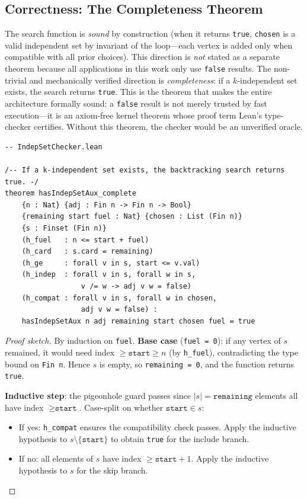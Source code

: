 \documentclass[11pt]{article}
\newcommand{\lean}[1]{\texttt{#1}}
\begin{document}
\subsection{Correctness: The Completeness Theorem}
\label{sec:checker:correct}

The search function is \emph{sound} by construction (when it returns
\lean{true}, \lean{chosen} is a valid independent set by invariant of the
loop---each vertex is added only when compatible with all prior choices).
This direction is \emph{not} stated as a separate theorem because all
applications in this work only use \lean{false} results.
The non-trivial and mechanically verified direction is \emph{completeness}:
if a $k$-independent set exists, the search returns \lean{true}.
This is the theorem that makes the entire architecture formally sound:
a \lean{false} result is not merely trusted by fast execution---it is an
axiom-free kernel theorem whose proof term Lean's type-checker certifies.
Without this theorem, the checker would be an unverified oracle.

\begin{lstlisting}
-- IndepSetChecker.lean

/-- If a k-independent set exists, the backtracking search returns true. -/
theorem hasIndepSetAux_complete
    {n : Nat} {adj : Fin n -> Fin n -> Bool}
    {remaining start fuel : Nat} {chosen : List (Fin n)}
    {s : Finset (Fin n)}
    (h_fuel   : n <= start + fuel)
    (h_card   : s.card = remaining)
    (h_ge     : forall v in s, start <= v.val)
    (h_indep  : forall v in s, forall w in s,
                  v /= w -> adj v w = false)
    (h_compat : forall v in s, forall w in chosen,
                  adj v w = false) :
    hasIndepSetAux n adj remaining start chosen fuel = true
\end{lstlisting}

\begin{proof}[Proof sketch]
By induction on \lean{fuel}.
\textbf{Base case} (\lean{fuel = 0}): if any vertex of $s$ remained,
it would need index $\geq \lean{start} \geq n$ (by \lean{h\_fuel}),
contradicting the type bound on \lean{Fin n}.
Hence $s$ is empty, so \lean{remaining = 0}, and the function returns
\lean{true}.

\textbf{Inductive step}: the pigeonhole guard passes since $|s| =
\lean{remaining}$ elements all have index $\geq \lean{start}$.
Case-split on whether $\lean{start} \in s$:
\begin{itemize}
  \item If yes: \lean{h\_compat} ensures the compatibility check passes.
    Apply the inductive hypothesis to $s \setminus \{\lean{start}\}$ to
    obtain \lean{true} for the include branch.
  \item If no: all elements of $s$ have index $\geq \lean{start} + 1$.
    Apply the inductive hypothesis to $s$ for the skip branch.
\end{itemize}
\end{proof}
\end{document}
